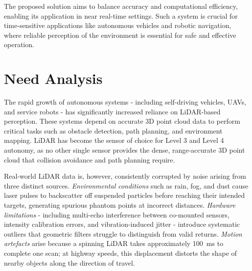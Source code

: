 \documentclass[12pt,a4paper]{article}
\begin{document}
The proposed solution aims to balance accuracy and computational efficiency,
enabling its application in near real-time settings. Such a system is crucial
for time-sensitive applications like autonomous vehicles and robotic
navigation, where reliable perception of the environment is essential for
safe and effective operation.
\clearpage

\section{Need Analysis}

The rapid growth of autonomous systems - including self-driving vehicles,
UAVs, and service robots - has significantly increased reliance on
LiDAR-based perception. These systems depend on accurate 3D point cloud data
to perform critical tasks such as obstacle detection, path planning, and
environment mapping. LiDAR has become the sensor of choice for Level 3 and
Level 4 autonomy, as no other single sensor provides the dense,
range-accurate 3D point cloud that collision avoidance and path planning
require.

Real-world LiDAR data is, however, consistently corrupted by noise arising
from three distinct sources. \emph{Environmental conditions} such as rain,
fog, and dust cause laser pulses to backscatter off suspended particles
before reaching their intended targets, generating spurious phantom points at
incorrect distances. \emph{Hardware limitations} - including multi-echo
interference between co-mounted sensors, intensity calibration errors, and
vibration-induced jitter - introduce systematic outliers that geometric
filters struggle to distinguish from valid returns. \emph{Motion artefacts}
arise because a spinning LiDAR takes approximately 100~ms to complete one
scan; at highway speeds, this displacement distorts the shape of nearby
objects along the direction of travel.
\end{document}
